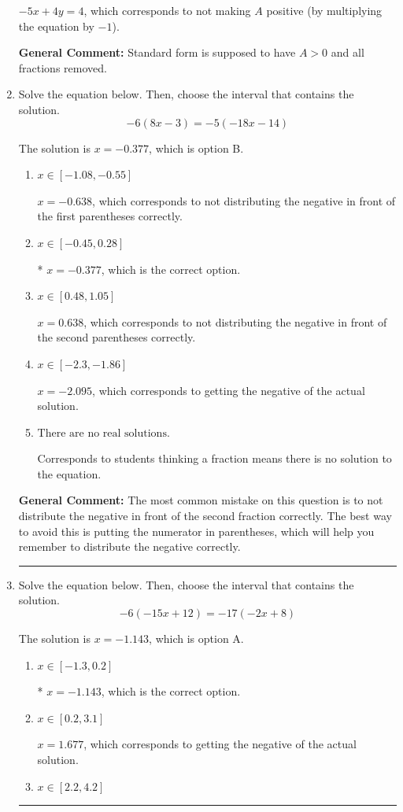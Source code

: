 \documentclass{extbook}[14pt]
\newcommand{\litem}[1]{\item #1

\rule{\textwidth}{0.4pt}}
\begin{document}
\begin{enumerate}
{\begin{enumerate}[label=\Alph*.]
 $-5x + 4y = 4$, which corresponds to not making $A$ positive (by multiplying the equation by $-1$).
\end{enumerate}

\textbf{General Comment:} Standard form is supposed to have $A > 0$ and all fractions removed.
}
\litem{
Solve the equation below. Then, choose the interval that contains the solution.
\[ -6(8x -3) = -5(-18x -14) \]

The solution is \( x = -0.377 \), which is option B.\begin{enumerate}[label=\Alph*.]
\item \( x \in [-1.08, -0.55] \)

$x = -0.638$, which corresponds to not distributing the negative in front of the first parentheses correctly.
\item \( x \in [-0.45, 0.28] \)

* $x = -0.377$, which is the correct option.
\item \( x \in [0.48, 1.05] \)

$x = 0.638$, which corresponds to not distributing the negative in front of the second parentheses correctly.
\item \( x \in [-2.3, -1.86] \)

$x = -2.095$, which corresponds to getting the negative of the actual solution.
\item \( \text{There are no real solutions.} \)

Corresponds to students thinking a fraction means there is no solution to the equation.
\end{enumerate}

\textbf{General Comment:} The most common mistake on this question is to not distribute the negative in front of the second fraction correctly. The best way to avoid this is putting the numerator in parentheses, which will help you remember to distribute the negative correctly.
}
\litem{
Solve the equation below. Then, choose the interval that contains the solution.
\[ -6(-15x + 12) = -17(-2x + 8) \]

The solution is \( x = -1.143 \), which is option A.\begin{enumerate}[label=\Alph*.]
\item \( x \in [-1.3, 0.2] \)

* $x = -1.143$, which is the correct option.
\item \( x \in [0.2, 3.1] \)

$x = 1.677$, which corresponds to getting the negative of the actual solution.
\item \( x \in [2.2, 4.2] \)


\end{enumerate}}
\end{enumerate}
\end{document}
